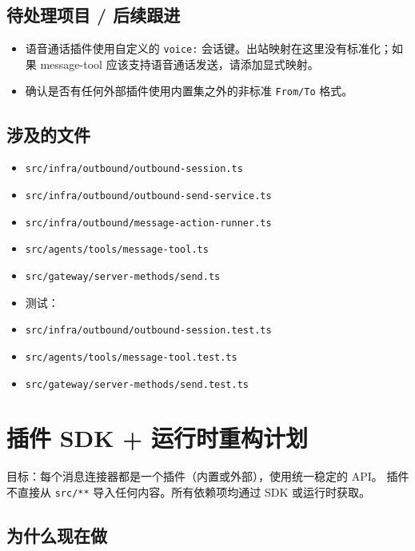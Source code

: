 \subsection{待处理项目 / 后续跟进}


\begin{itemize}
  \item 语音通话插件使用自定义的 \texttt{voice:} 会话键。出站映射在这里没有标准化；如果 message-tool 应该支持语音通话发送，请添加显式映射。
  \item 确认是否有任何外部插件使用内置集之外的非标准 \texttt{From/To} 格式。
\end{itemize}


\subsection{涉及的文件}


\begin{itemize}
  \item \texttt{src/infra/outbound/outbound-session.ts}
  \item \texttt{src/infra/outbound/outbound-send-service.ts}
  \item \texttt{src/infra/outbound/message-action-runner.ts}
  \item \texttt{src/agents/tools/message-tool.ts}
  \item \texttt{src/gateway/server-methods/send.ts}
  \item 测试：
  \item \texttt{src/infra/outbound/outbound-session.test.ts}
  \item \texttt{src/agents/tools/message-tool.test.ts}
  \item \texttt{src/gateway/server-methods/send.test.ts}
\end{itemize}



\clearpage

\section{插件 SDK + 运行时重构计划}


目标：每个消息连接器都是一个插件（内置或外部），使用统一稳定的 API。
插件不直接从 \texttt{src/**} 导入任何内容。所有依赖项均通过 SDK 或运行时获取。

\subsection{为什么现在做}


